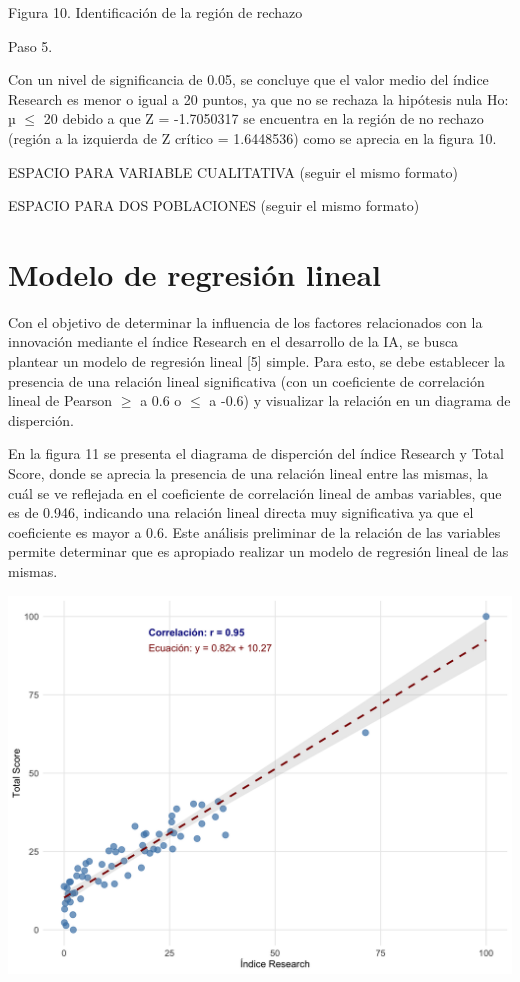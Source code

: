 \documentclass[
]{article}
\begin{document}
\begin{multicols}{2}
Figura 10. Identificación de la región de rechazo

Paso 5.

Con un nivel de significancia de 0.05, se concluye que el valor medio del índice Research es menor o igual a 20 puntos, ya que no se rechaza la hipótesis nula Ho: µ $≤$ 20 debido a que Z = -1.7050317 se encuentra en la región de no rechazo (región a la izquierda de Z crítico = 1.6448536) como se aprecia en la figura 10.

ESPACIO PARA VARIABLE CUALITATIVA (seguir el mismo formato)

ESPACIO PARA DOS POBLACIONES (seguir el mismo formato)


\section{Modelo de regresión lineal}

Con el objetivo de determinar la influencia de los factores relacionados con la innovación mediante el índice Research en el desarrollo de la IA, se busca plantear un modelo de regresión lineal [5] simple. Para esto, se debe establecer la presencia de una relación lineal significativa (con un coeficiente de correlación lineal de Pearson $≥$ a 0.6 o $≤$ a -0.6) y visualizar la relación en un diagrama de disperción.




En la figura 11 se presenta el diagrama de disperción del índice Research y Total Score, donde se aprecia la presencia de una relación lineal entre las mismas, la cuál se ve reflejada en el coeficiente de correlación lineal de ambas variables, que es de 0.946, indicando una relación lineal directa muy significativa ya que el coeficiente es mayor a 0.6. Este análisis preliminar de la relación de las variables permite determinar que es apropiado realizar un modelo de regresión lineal de las mismas.



\begin{center}
\includegraphics[width=\linewidth]{figura11.png}
\end{center}


\end{multicols}
\end{document}
